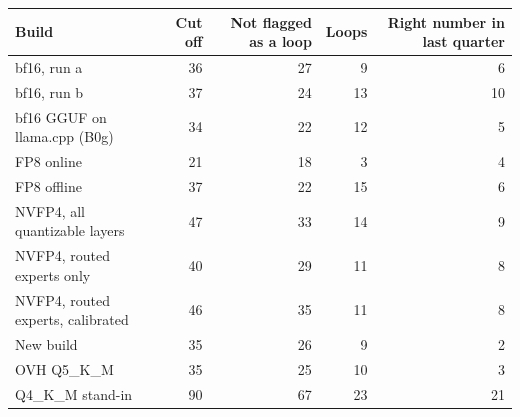 \begin{tabular}{@{}lrrrr@{}}
\toprule
Build & Cut off & Not flagged as a loop & Loops & Right number in last quarter \\
\midrule
bf16, run a & 36 & 27 & 9 & 6 \\
bf16, run b & 37 & 24 & 13 & 10 \\
bf16 GGUF on llama.cpp (B0g) & 34 & 22 & 12 & 5 \\
FP8 online & 21 & 18 & 3 & 4 \\
FP8 offline & 37 & 22 & 15 & 6 \\
NVFP4, all quantizable layers & 47 & 33 & 14 & 9 \\
NVFP4, routed experts only & 40 & 29 & 11 & 8 \\
NVFP4, routed experts, calibrated & 46 & 35 & 11 & 8 \\
New build & 35 & 26 & 9 & 2 \\
OVH Q5\_K\_M & 35 & 25 & 10 & 3 \\
Q4\_K\_M stand-in & 90 & 67 & 23 & 21 \\
\bottomrule
\end{tabular}
